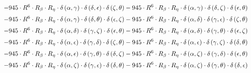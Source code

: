 \begin{subequations}
\begin{gather}
 \\[0.2em] \notag 		 - 945 \cdot R^{6} \cdot R_{\beta{}} \cdot R_{\eta{}} \cdot \delta{}\left(\alpha{}, \gamma{}\right) \cdot \delta{}\left(\delta{}, \epsilon{}\right) \cdot \delta{}\left(\zeta{}, \theta{}\right)- 945 \cdot R^{6} \cdot R_{\beta{}} \cdot R_{\eta{}} \cdot \delta{}\left(\alpha{}, \gamma{}\right) \cdot \delta{}\left(\delta{}, \zeta{}\right) \cdot \delta{}\left(\epsilon{}, \theta{}\right) 
 \\[0.2em] \notag 		 - 945 \cdot R^{6} \cdot R_{\beta{}} \cdot R_{\eta{}} \cdot \delta{}\left(\alpha{}, \gamma{}\right) \cdot \delta{}\left(\delta{}, \theta{}\right) \cdot \delta{}\left(\epsilon{}, \zeta{}\right)- 945 \cdot R^{6} \cdot R_{\beta{}} \cdot R_{\eta{}} \cdot \delta{}\left(\alpha{}, \delta{}\right) \cdot \delta{}\left(\gamma{}, \epsilon{}\right) \cdot \delta{}\left(\zeta{}, \theta{}\right) 
 \\[0.2em] \notag 		 - 945 \cdot R^{6} \cdot R_{\beta{}} \cdot R_{\eta{}} \cdot \delta{}\left(\alpha{}, \delta{}\right) \cdot \delta{}\left(\gamma{}, \zeta{}\right) \cdot \delta{}\left(\epsilon{}, \theta{}\right)- 945 \cdot R^{6} \cdot R_{\beta{}} \cdot R_{\eta{}} \cdot \delta{}\left(\alpha{}, \delta{}\right) \cdot \delta{}\left(\gamma{}, \theta{}\right) \cdot \delta{}\left(\epsilon{}, \zeta{}\right) 
 \\[0.2em] \notag 		 - 945 \cdot R^{6} \cdot R_{\beta{}} \cdot R_{\eta{}} \cdot \delta{}\left(\alpha{}, \epsilon{}\right) \cdot \delta{}\left(\gamma{}, \delta{}\right) \cdot \delta{}\left(\zeta{}, \theta{}\right)- 945 \cdot R^{6} \cdot R_{\beta{}} \cdot R_{\eta{}} \cdot \delta{}\left(\alpha{}, \epsilon{}\right) \cdot \delta{}\left(\gamma{}, \zeta{}\right) \cdot \delta{}\left(\delta{}, \theta{}\right) 
 \\[0.2em] \notag 		 - 945 \cdot R^{6} \cdot R_{\beta{}} \cdot R_{\eta{}} \cdot \delta{}\left(\alpha{}, \epsilon{}\right) \cdot \delta{}\left(\gamma{}, \theta{}\right) \cdot \delta{}\left(\delta{}, \zeta{}\right)- 945 \cdot R^{6} \cdot R_{\beta{}} \cdot R_{\eta{}} \cdot \delta{}\left(\alpha{}, \zeta{}\right) \cdot \delta{}\left(\gamma{}, \delta{}\right) \cdot \delta{}\left(\epsilon{}, \theta{}\right) 
 \\[0.2em] \notag 		 - 945 \cdot R^{6} \cdot R_{\beta{}} \cdot R_{\eta{}} \cdot \delta{}\left(\alpha{}, \zeta{}\right) \cdot \delta{}\left(\gamma{}, \epsilon{}\right) \cdot \delta{}\left(\delta{}, \theta{}\right)- 945 \cdot R^{6} \cdot R_{\beta{}} \cdot R_{\eta{}} \cdot \delta{}\left(\alpha{}, \zeta{}\right) \cdot \delta{}\left(\gamma{}, \theta{}\right) \cdot \delta{}\left(\delta{}, \epsilon{}\right) 

\end{gather}
\end{subequations}
